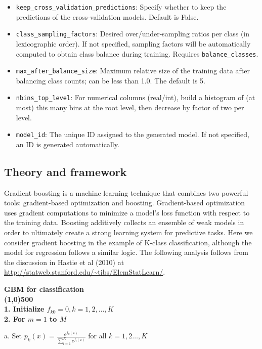 \begin{itemize}
\item {\texttt{keep\_cross\_validation\_predictions}}: Specify whether to keep the predictions of the cross-validation models.   Default is False.
\item {\texttt{class\_sampling\_factors}}: Desired over/under-sampling ratios per class (in lexicographic order). If not specified, sampling factors will be automatically computed to obtain class balance during training. Requires \texttt{balance\_classes}.
\item {\texttt{max\_after\_balance\_size}}: Maximum relative size of the training data after balancing class counts; can be less than 1.0.  The default is 5.
\item {\texttt{nbins\_top\_level}}: For numerical columns (real/int), build a histogram of (at most) this many bins at the root level, then decrease by factor of two per level.
\item \texttt{model\_id}: The unique ID assigned to the generated model. If not specified, an ID is generated automatically.
\end{itemize}



\subsection{Theory and framework}

Gradient boosting is a machine learning technique that combines two powerful tools: gradient-based optimization and
boosting. Gradient-based optimization uses gradient computations to minimize a model's loss function with respect to
the training data. Boosting additively collects an ensemble of weak models in order to ultimately create a strong
learning system for predictive tasks. Here we consider gradient boosting in the example of K-class classification,
although the model for regression follows a similar logic. The following analysis follows from the discussion in
Hastie et al (2010) at {\url{http://statweb.stanford.edu/~tibs/ElemStatLearn/}}.


\bf{\footnotesize{GBM for classification}}
\normalfont
\\
\line(1,0){500}
\\
1. Initialize $f_{k0} = 0, k = 1,2,\dots,K$
\\
2. For $m=1$ to $M$

\hspace{1cm} a. Set $p_k(x) = \frac{e^{f_k(x)}}{\sum_{l=1}^K e^{f_l(x)}}$ for all $k = 1,2\dots, K$

